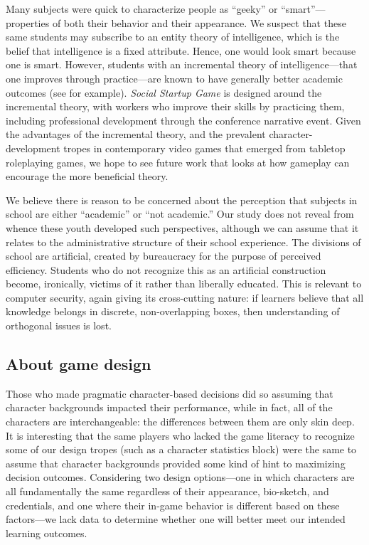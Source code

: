 \documentclass[letterpaper]{article}
\begin{document}
Many subjects were quick to characterize people as ``geeky'' or
``smart''---properties of both their behavior and their appearance. 
We suspect that these same students may subscribe to an entity theory
of intelligence, which is the belief that intelligence is a fixed
attribute. Hence, one would look smart because one is smart.
However, students with an incremental theory of intelligence---that 
one improves through practice---are known to have generally better
academic outcomes (see \citet{Blackwell2007} for example).
\textit{Social Startup Game} is designed around the incremental theory,
with workers who improve their skills by practicing them, including
professional development through the conference narrative event.
Given the advantages of the incremental theory, and the prevalent
character-development tropes in contemporary video games that emerged
from tabletop roleplaying games, we hope to see future work that looks
at how gameplay can encourage the more beneficial theory.

We believe there is reason to be concerned about the perception that
subjects in school are either ``academic'' or ``not academic.''
Our study does not reveal from whence these youth developed
such perspectives, although we can assume that it relates to the
administrative structure of their school experience.
The divisions of school are artificial, created by bureaucracy for
the purpose of perceived efficiency.
Students who do not recognize this as an artificial construction 
become, ironically, victims of it rather than liberally educated.
This is relevant to computer security, again giving its cross-cutting
nature: if learners believe that all knowledge belongs in discrete,
non-overlapping boxes, then understanding of orthogonal issues is lost.


\subsection{About game design}

Those who made pragmatic character-based decisions did so assuming
that character backgrounds impacted their performance, while in fact,
all of the characters are interchangeable: the differences between
them are only skin deep. 
It is interesting that the same players who lacked the game literacy to
recognize some of our design tropes (such as a character statistics block)
were the same to assume
that character backgrounds provided some kind of hint to
maximizing decision outcomes.
Considering two design options---one in which characters are all fundamentally
the same regardless of their appearance, bio-sketch, and credentials, and one where their in-game behavior is different based on these factors---we lack data
to determine whether one will better meet our intended learning outcomes.
\end{document}
